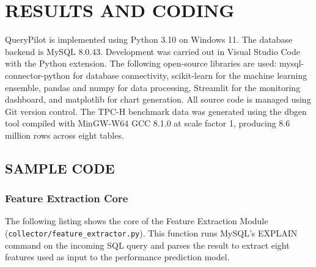 
\chapter{RESULTS AND CODING}
\label{chap:results}

QueryPilot is implemented using Python 3.10 on Windows 11. The database backend
is MySQL 8.0.43. Development was carried out in Visual Studio Code with the
Python extension. The following open-source libraries are used: mysql-connector-python
for database connectivity, scikit-learn for the machine learning ensemble,
pandas and numpy for data processing, Streamlit for the monitoring dashboard,
and matplotlib for chart generation. All source code is managed using Git
version control. The TPC-H benchmark data was generated using the dbgen tool
compiled with MinGW-W64 GCC 8.1.0 at scale factor 1, producing 8.6 million
rows across eight tables.

\section{SAMPLE CODE}
\label{sec:sample_code}

\subsection{Feature Extraction Core}
\label{subsec:code_features}

The following listing shows the core of the Feature Extraction Module
(\texttt{collector/feature\_extractor.py}). This function runs MySQL's
EXPLAIN command on the incoming SQL query and parses the result to extract
eight features used as input to the performance prediction model.

